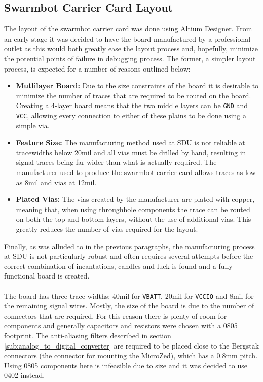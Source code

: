 \subsection{Swarmbot Carrier Card Layout} %
\label{sub:swarmbot_carrier_card_layout}
The layout of the swarmbot carrier card was done using Altium Designer.
From an early stage it was decided to have the board manufactured by a professional outlet as this would both greatly ease the layout process and, hopefully, minimize the potential points of failure in debugging process.
The former, a simpler layout process, is expected for a number of reasons outlined below:
\begin{itemize}
  	\item \textbf{Mutlilayer Board:} Due to the size constraints of the board it is desirable to minimize the number of traces that are required to be routed on the board.
  	Creating a 4-layer board means that the two middle layers can be \texttt{GND} and \texttt{VCC}, allowing every connection to either of these plains to be done using a simple via.
  	\item \textbf{Feature Size:} The manufacturing method used at SDU is not reliable at tracewidths below 20mil and all vias must be drilled by hand, resulting in signal traces being far wider than what is actually required.
  	The manufacturer used to produce the swarmbot carrier card \cite{itead} allows traces as low as 8mil and vias at 12mil.
  	\item \textbf{Plated Vias:} The vias created by the manufacturer are plated with copper, meaning that, when using throughhole components the trace can be routed on both the top and bottom layers, without the use of additional vias.
  	This greatly reduces the number of vias required for the layout.
  \end{itemize}
Finally, as was alluded to in the previous paragraphs, the manufacturing process at SDU is not particularly robust and often requires several attempts before the correct combination of incantations, candles and luck is found and a fully functional board is created.
\\~\\
The board has three trace widths: 40mil for \texttt{VBATT}, 20mil for \texttt{VCCIO} and 8mil for the remaining signal wires.
Mostly, the size of the board is due to the number of connectors that are required.
For this reason there is plenty of room for components and generally capacitors and resistors were chosen with a 0805 footprint.
The anti-aliasing filters described in section \ref{sub:analog_to_digital_converter} are required to be placed close to the Bergstak connectors (the connector for mounting the MicroZed), which has a 0.8mm pitch.
Using 0805 components here is infeasible due to size and it was decided to use 0402 instead.
